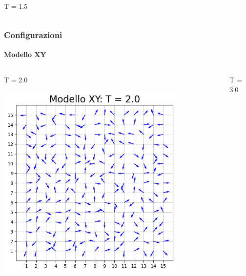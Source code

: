 \begin{frame}
\begin{columns}
\begin{column}{0.5\textwidth}
\begin{block}{T = 1.5}
            \end{block}
        \end{column}
    \end{columns}

\end{frame}



\begin{frame}
    \frametitle{Configurazioni}
    \framesubtitle{Modello XY}

    \begin{columns}
        \begin{column}{0.5\textwidth}
            \begin{block}{T = 2.0}

            \centering
            \includegraphics[width=0.8\textwidth]{Immagini/backupXY/conf_T2.0.png}

            \end{block}
        \end{column}
    
        \begin{column}{0.5\textwidth}
            \begin{block}{T = 3.0}


\end{block}
\end{column}
\end{columns}
\end{frame}
